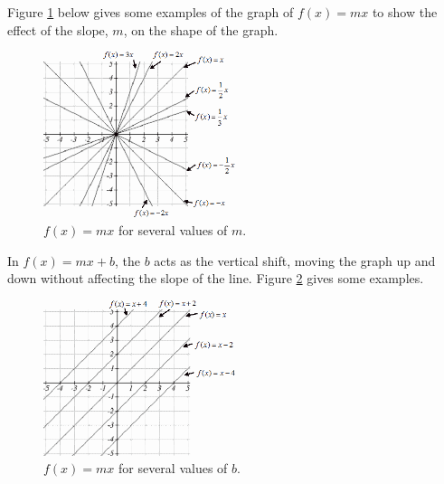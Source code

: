 Figure \ref{fig:slopes} below gives some examples of the graph of $f(x)=mx$ to show the effect of the slope, $m$, on the shape of the graph.

\begin{figure}[!ht]
\centering
\includegraphics[width=0.5\textwidth]{img/chap1/sec1-4/image050.png}
\caption{$f(x)=mx$ for several values of $m$.}
\label{fig:slopes}
\end{figure}

In $f(x)=mx+b$, the $b$ acts as the vertical shift, moving the graph up and down without affecting the slope of the line. Figure \ref{fig:b-shift} gives some examples.

\begin{figure}[!ht]
  \centering
  \includegraphics[width=0.5\textwidth]{img/chap1/sec1-4/image051.png}
  \caption{$f(x)=mx$ for several values of $b$.}
  \label{fig:b-shift}
\end{figure}

